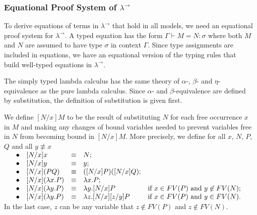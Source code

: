 \subsubsection{Equational Proof System of $ \lambda ^\to $}
\label{sec:bg_lc_eps}
To derive equations of terms in $ \lambda ^\to $ that hold in all models, we need an equational proof system for $ \lambda ^\to $. A typed equation has the form $ \Gamma \vdash M=N:\sigma $ where both $ M $ and $ N $ are assumed to have type $ \sigma $ in context $ \Gamma $. Since type assignments are included in equations, we have an equational version of the typing rules that build well-typed equations in $ \lambda ^\to $.

The simply typed lambda calculus has the same theory of $ \alpha $-, $ \beta $- and $ \eta $-equivalence as the pure lambda calculus. Since $ \alpha $- and $ \beta $-equivalence are defined by substitution, the definition of substitution is given first.

\begin{definition}
\label{definition:substitution}
We define $ [N/x]M $ to be the result of substituting $ N $ for each free occurrence $ x $ in $ M $ and making any changes of bound variables needed to prevent variables free in $ N $ from becoming bound in $ [N/x]M $. More precisely, we define for all $ x $, $ N $, $ P $, $ Q $ and all $ y \not\equiv x $\\
$
\begin{array}{rllll}
\hspace*{12pt} \bullet & [N/x]x & \equiv & N; & \\
\bullet & [N/x]y & \equiv & y; & \\
\bullet & [N/x](PQ) & \equiv & ([N/x]P)([N/x]Q); & \\
\bullet & [N/x](\lambda x.P) & \equiv & \lambda x.P; & \\
\bullet & [N/x](\lambda y.P) & \equiv & \lambda y.[N/x]P & \text{if } x \in FV(P) \text{ and } y \not\in FV(N); \\
\bullet & [N/x](\lambda y.P) & \equiv & \lambda z.[N/x][z/y]P & \text{if } x \in FV(P) \text{ and } y \in FV(N). \\
\end{array}
$\\
In the last case, $ z $ can be any variable that $ z \not\in FV(P) $ and $ z \not\in FV(N) $.
\end{definition}

